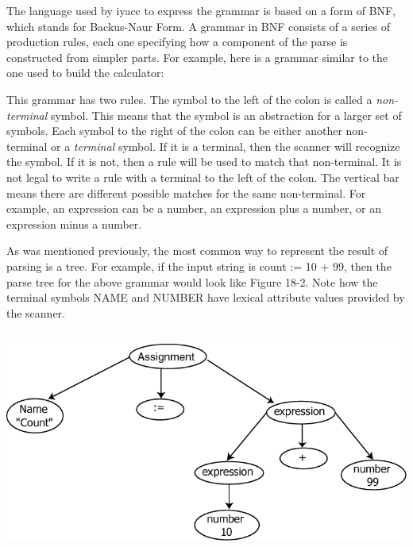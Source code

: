 The language used by \textsf{iyacc} to express the grammar is based on a
form of BNF, which stands for Backus-Naur Form. A grammar in BNF consists of a series of
production rules, each one specifying how a component of the parse is
constructed from simpler parts. For example, here is a grammar similar
to the one used to build the calculator:


This grammar has two rules. The symbol to the left of the colon is
called a \textit{non-terminal} symbol. This means that the symbol is an
abstraction for a larger set of symbols. Each symbol to the right of
the colon can be either another non-terminal or a \textit{terminal}
symbol. If it is a terminal, then the scanner will recognize the
symbol. If it is not, then a rule will be used to match that
non-terminal. It is not legal to write a rule with a terminal to the
left of the colon. The vertical bar means there are different possible
matches for the same non-terminal. For example, an expression can be a
number, an expression plus a number, or an expression minus a number.

As was mentioned previously, the most common way to represent the result
of parsing is a tree. For example, if the input string is
\textsf{{\textquotedbl}count := 10 + 99{\textquotedbl}}, then the parse
tree for the above grammar would look like Figure 18-2. Note how the
terminal symbols NAME and NUMBER have lexical attribute values provided
by the scanner.


\bigskip

\begin{center}
\includegraphics[width=5.8752in,height=2.8929in]{ub-img/ub-img65.png}
\end{center}

